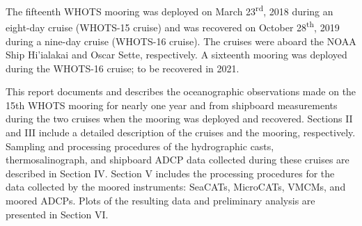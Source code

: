 The fifteenth WHOTS mooring was deployed on March 23\textsuperscript{rd}, 2018 during an eight-day cruise (WHOTS-15 cruise) and was recovered on October 28\textsuperscript{th}, 2019 during a nine-day cruise (WHOTS-16 cruise). The cruises were aboard the NOAA Ship Hi’ialakai and Oscar Sette, respectively. A sixteenth mooring was deployed during the WHOTS-16 cruise; to be recovered in 2021.  
	
This report documents and describes the oceanographic observations made on the 15th WHOTS mooring for nearly one year and from shipboard measurements during the two cruises when the mooring was deployed and recovered. Sections II and III include a detailed description of the cruises and the mooring, respectively. Sampling and processing procedures of the hydrographic casts, thermosalinograph, and shipboard ADCP data collected during these cruises are described in Section IV. Section V includes the processing procedures for the data collected by the moored instruments: SeaCATs, MicroCATs, VMCMs, and moored ADCPs. Plots of the resulting data and preliminary analysis are presented in Section VI.

